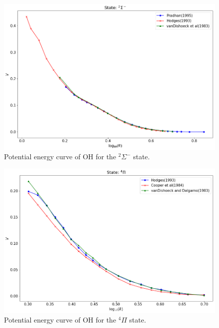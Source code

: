 \documentclass[12pt]{article}
\begin{document}
\begin{figure}[h]
    \centering
    \includegraphics[scale=0.45]{img/OH_2sigmaminus.png}
    \caption{Potential energy curve of OH for the $^2\Sigma^-$ state.}
    \label{fig:oh4}
\end{figure}
\begin{figure}[h]
    \centering
    \includegraphics[scale=0.5]{img/OH_4pi.png}
    \caption{Potential energy curve of OH for the $ ^4\Pi$ state.}
    \label{fig:oh5}
\end{figure}
\fi








\clearpage


\end{document}
